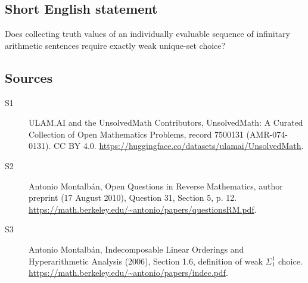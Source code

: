 \documentclass[11pt]{article}
\begin{document}
\subsection{Short English statement}
Does collecting truth values of an individually evaluable sequence of infinitary arithmetic sentences require exactly weak unique-set choice?
\subsection{Sources}
\begin{description}
\item[\hypertarget{source:7500131:1}{S1}] ULAM.AI and the UnsolvedMath Contributors, UnsolvedMath: A Curated Collection of Open Mathematics Problems, record 7500131 (AMR-074-0131). CC BY 4.0. \url{https://huggingface.co/datasets/ulamai/UnsolvedMath}.
\item[\hypertarget{source:7500131:2}{S2}] Antonio Montalbán, Open Questions in Reverse Mathematics, author preprint (17 August 2010), Question 31, Section 5, p. 12. \url{https://math.berkeley.edu/~antonio/papers/questionsRM.pdf}.
\item[\hypertarget{source:7500131:3}{S3}] Antonio Montalbán, Indecomposable Linear Orderings and Hyperarithmetic Analysis (2006), Section 1.6, definition of weak $\Sigma^1_1$ choice. \url{https://math.berkeley.edu/~antonio/papers/indec.pdf}.
\end{description}
\label{end:7500131}
\end{document}
